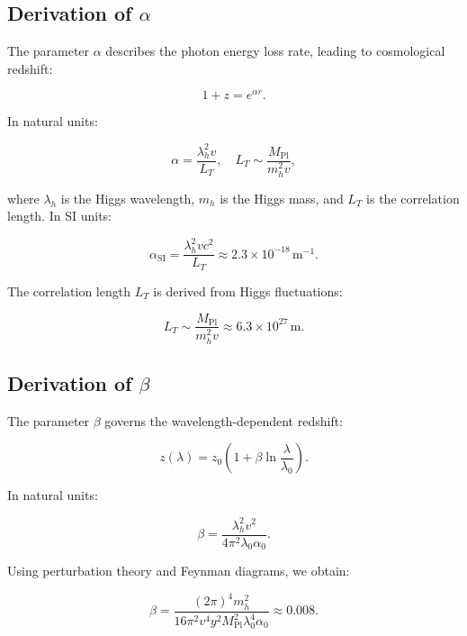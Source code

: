 \documentclass[a4paper,12pt]{article}
\newcommand{\Mpl}{M_{\text{Pl}}}
\theoremstyle{definition}
\theoremstyle{remark}
\begin{document}
	\subsection{Derivation of \(\alpha\)}
	
	The parameter \(\alpha\) describes the photon energy loss rate, leading to cosmological redshift:
	
	\begin{equation}
		1 + z = e^{\alpha r}.
	\end{equation}
	
	In natural units:
	
	\begin{equation}
		\alpha = \frac{\lambda_h^2 v}{L_T}, \quad L_T \sim \frac{\Mpl}{m_h^2 v},
	\end{equation}
	
	where \( \lambda_h \) is the Higgs wavelength, \( m_h \) is the Higgs mass, and \( L_T \) is the correlation length. In SI units:
	
	\begin{equation}
		\alpha_{\text{SI}} = \frac{\lambda_h^2 v c^2}{L_T} \approx 2.3 \times 10^{-18} \, \text{m}^{-1}.
	\end{equation}
	
	The correlation length \( L_T \) is derived from Higgs fluctuations:
	
	\begin{equation}
		L_T \sim \frac{\Mpl}{m_h^2 v} \approx 6.3 \times 10^{27} \, \text{m}.
	\end{equation}
	
	\subsection{Derivation of \(\beta\)}
	
	The parameter \(\beta\) governs the wavelength-dependent redshift:
	
	\begin{equation}
		z(\lambda) = z_0 \left(1 + \beta \ln \frac{\lambda}{\lambda_0}\right).
	\end{equation}
	
	In natural units:
	
	\begin{equation}
		\beta = \frac{\lambda_h^2 v^2}{4 \pi^2 \lambda_0 \alpha_0}.
	\end{equation}
	
	Using perturbation theory and Feynman diagrams, we obtain:
	
	\begin{equation}
		\beta = \frac{(2\pi)^4 m_h^2}{16 \pi^2 v^4 y^2 \Mpl^2 \lambda_0^4 \alpha_0} \approx 0.008.
	\end{equation}
	
\end{document}

